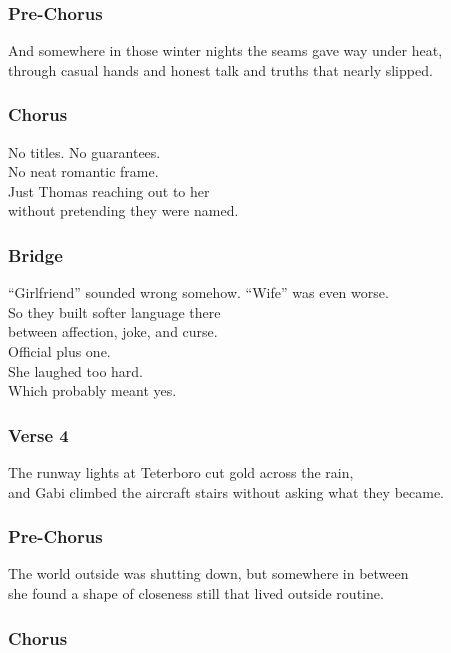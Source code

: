 \subsubsection{Pre-Chorus}\label{pre-chorus-18}

And somewhere in those winter nights the seams gave way under heat,\\
through casual hands and honest talk and truths that nearly slipped.

\subsubsection{Chorus}\label{chorus-28}

No titles. No guarantees.\\
No neat romantic frame.\\
Just Thomas reaching out to her\\
without pretending they were named.

\subsubsection{Bridge}\label{bridge-8}

``Girlfriend'' sounded wrong somehow. ``Wife'' was even worse.\\
So they built softer language there\\
between affection, joke, and curse.\\
Official plus one.\\
She laughed too hard.\\
Which probably meant yes.

\subsubsection{Verse 4}\label{verse-4-4}

The runway lights at Teterboro cut gold across the rain,\\
and Gabi climbed the aircraft stairs without asking what they became.

\subsubsection{Pre-Chorus}\label{pre-chorus-19}

The world outside was shutting down, but somewhere in between\\
she found a shape of closeness still that lived outside routine.

\subsubsection{Chorus}\label{chorus-29}

